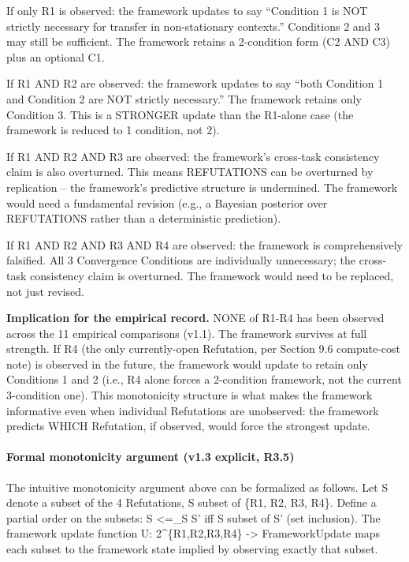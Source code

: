 \documentclass[
]{article}
\begin{document}
If only R1 is observed: the framework updates to say ``Condition 1 is
NOT strictly necessary for transfer in non-stationary contexts.''
Conditions 2 and 3 may still be sufficient. The framework retains a
2-condition form (C2 AND C3) plus an optional C1.

If R1 AND R2 are observed: the framework updates to say ``both Condition
1 and Condition 2 are NOT strictly necessary.'' The framework retains
only Condition 3. This is a STRONGER update than the R1-alone case (the
framework is reduced to 1 condition, not 2).

If R1 AND R2 AND R3 are observed: the framework's cross-task consistency
claim is also overturned. This means REFUTATIONS can be overturned by
replication -- the framework's predictive structure is undermined. The
framework would need a fundamental revision (e.g., a Bayesian posterior
over REFUTATIONS rather than a deterministic prediction).

If R1 AND R2 AND R3 AND R4 are observed: the framework is
comprehensively falsified. All 3 Convergence Conditions are individually
unnecessary; the cross-task consistency claim is overturned. The
framework would need to be replaced, not just revised.

\textbf{Implication for the empirical record.} NONE of R1-R4 has been
observed across the 11 empirical comparisons (v1.1). The framework
survives at full strength. If R4 (the only currently-open Refutation,
per Section 9.6 compute-cost note) is observed in the future, the
framework would update to retain only Conditions 1 and 2 (i.e., R4 alone
forces a 2-condition framework, not the current 3-condition one). This
monotonicity structure is what makes the framework informative even when
individual Refutations are unobserved: the framework predicts WHICH
Refutation, if observed, would force the strongest update.

\paragraph{Formal monotonicity argument (v1.3 explicit,
R3.5)}\label{formal-monotonicity-argument-v1.3-explicit-r3.5}

The intuitive monotonicity argument above can be formalized as follows.
Let S denote a subset of the 4 Refutations, S subset of \{R1, R2, R3,
R4\}. Define a partial order on the subsets: S \textless=\_S S' iff S
subset of S' (set inclusion). The framework update function U:
2\^{}\{R1,R2,R3,R4\} -\textgreater{} FrameworkUpdate maps each subset to
the framework state implied by observing exactly that subset.
\end{document}
